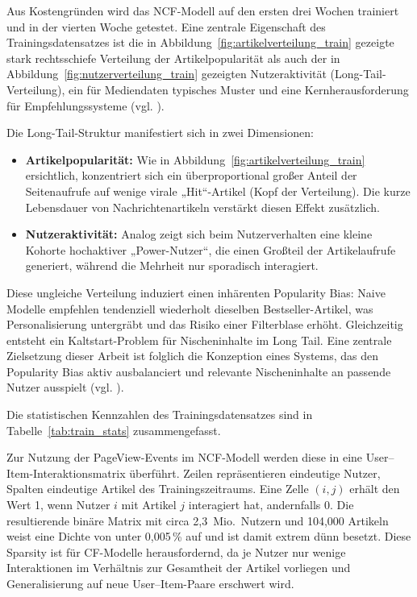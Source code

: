 Aus Kostengründen wird das NCF-Modell auf den ersten drei Wochen trainiert und in der vierten Woche getestet. 
Eine zentrale Eigenschaft des Trainingsdatensatzes ist die in Abbildung~\ref{fig:artikelverteilung_train} gezeigte stark 
rechtsschiefe Verteilung der Artikelpopularität als auch der in Abbildung~\ref{fig:nutzerverteilung_train}
gezeigten Nutzeraktivität (Long-Tail-Verteilung), ein für Mediendaten typisches Muster und eine Kernherausforderung für 
Empfehlungssysteme (vgl. \cite{wu_personalized_2022, raza_news_2020}).


Die Long-Tail-Struktur manifestiert sich in zwei Dimensionen:
\begin{itemize}
    \item \textbf{Artikelpopularität:} Wie in Abbildung~\ref{fig:artikelverteilung_train} ersichtlich, 
    konzentriert sich ein \newline überproportional großer Anteil der Seitenaufrufe auf wenige virale „Hit“-Artikel 
    (Kopf der Verteilung). Die kurze Lebensdauer von Nachrichtenartikeln verstärkt diesen Effekt zusätzlich.
    \item \textbf{Nutzeraktivität:} Analog zeigt sich beim Nutzerverhalten eine kleine Kohorte hochaktiver 
    „Power-Nutzer“, die einen Großteil der Artikelaufrufe generiert, während die Mehrheit nur sporadisch interagiert.
\end{itemize}
Diese ungleiche Verteilung induziert einen inhärenten Popularity Bias: Naive Modelle empfehlen tendenziell 
wiederholt dieselben Bestseller-Artikel, was Personalisierung untergräbt und das Risiko einer Filterblase erhöht. 
Gleichzeitig entsteht ein Kaltstart-Problem für Nischeninhalte im Long Tail. Eine zentrale Zielsetzung 
dieser Arbeit ist folglich die Konzeption eines Systems, das den Popularity Bias aktiv ausbalanciert und 
relevante Nischeninhalte an passende Nutzer ausspielt (vgl. \cite{Abdollahpouri_Popularity_Bias_2019}).


Die statistischen Kennzahlen des Trainingsdatensatzes sind in Tabelle~\ref{tab:train_stats} zusammengefasst.

\label{tab:train_stats}

Zur Nutzung der PageView-Events im \ac{NCF}-Modell werden diese in eine \newline User–Item-Interaktionsmatrix überführt. 
Zeilen repräsentieren eindeutige Nutzer, Spalten eindeutige Artikel des Trainingszeitraums. 
Eine Zelle $(i,j)$ erhält den Wert 1, wenn Nutzer $i$ mit Artikel $j$ interagiert hat, andernfalls 0. 
Die resultierende binäre Matrix mit circa 2{,}3~Mio.\ Nutzern und 104{,}000 Artikeln weist eine Dichte 
von unter 0{,}005\,\% auf und ist damit extrem dünn besetzt. Diese Sparsity ist für \ac{CF}-Modelle herausfordernd, 
da je Nutzer nur wenige Interaktionen im Verhältnis zur Gesamtheit der Artikel vorliegen und Generalisierung auf 
neue User–Item-Paare erschwert wird.

